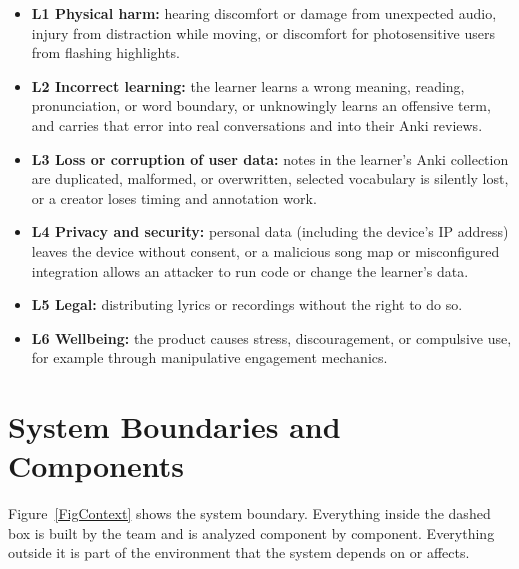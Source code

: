 \documentclass{article}
\begin{document}
\begin{itemize}
  \item \textbf{L1 Physical harm:} hearing discomfort or damage from
        unexpected audio, injury from distraction while moving, or discomfort
        for photosensitive users from flashing highlights.
  \item \textbf{L2 Incorrect learning:} the learner learns a wrong meaning,
        reading, pronunciation, or word boundary, or unknowingly learns an
        offensive term, and carries that error into real conversations and
        into their Anki reviews.
  \item \textbf{L3 Loss or corruption of user data:} notes in the learner's
        Anki collection are duplicated, malformed, or overwritten, selected
        vocabulary is silently lost, or a creator loses timing and annotation
        work.
  \item \textbf{L4 Privacy and security:} personal data (including the
        device's IP address) leaves the device without consent, or a malicious
        song map or misconfigured integration allows an attacker to run code or
        change the learner's data.
  \item \textbf{L5 Legal:} distributing lyrics or recordings without the
        right to do so.
  \item \textbf{L6 Wellbeing:} the product causes stress, discouragement, or
        compulsive use, for example through manipulative engagement
        mechanics.
\end{itemize}

\section{System Boundaries and Components} \label{SecBoundary}

Figure~\ref{FigContext} shows the system boundary. Everything inside the
dashed box is built by the team and is analyzed component by component.
Everything outside it is part of the environment that the system depends on
or affects.
\end{document}
